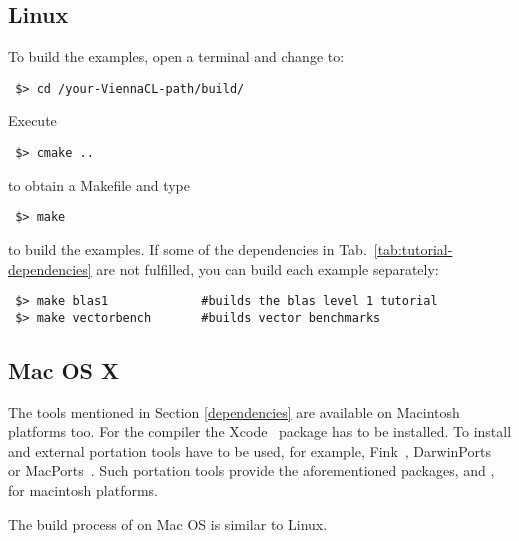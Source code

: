 \subsection{Linux}
To build the examples, open a terminal and change to:
\begin{lstlisting}
 $> cd /your-ViennaCL-path/build/
\end{lstlisting}
Execute
\begin{lstlisting}
 $> cmake ..
\end{lstlisting}
to obtain a Makefile and type
\begin{lstlisting}
 $> make 
\end{lstlisting}
to build the examples. If some of the dependencies in Tab.~\ref{tab:tutorial-dependencies} are not fulfilled, you can build each example separately:
\begin{lstlisting}
 $> make blas1             #builds the blas level 1 tutorial
 $> make vectorbench       #builds vector benchmarks
\end{lstlisting}


\subsection{Mac OS X}
\label{apple}
The tools mentioned in Section \ref{dependencies} are available on 
Macintosh platforms too. 
For the {\GCC} compiler the Xcode~\cite{xcode} package has to be installed.
To install {\CMake} and {\Boost} external portation tools have to be used, 
for example, Fink~\cite{fink}, DarwinPorts~\cite{darwinports} 
or MacPorts~\cite{macports}. Such portation tools provide the 
aforementioned packages, {\CMake} and {\Boost}, for macintosh platforms. 


The build process of {\ViennaCL} on Mac OS is similar to Linux.


